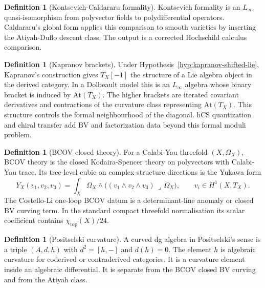 \documentclass[11pt]{amsart}
\theoremstyle{definition}
\newtheorem{definition}[theorem]{Definition}
\theoremstyle{remark}
\providecommand{\At}{\mathrm{At}}
\begin{document}
\begin{definition}[Kontsevich-Caldararu formality]
\label{def:kc-formality}
Kontsevich formality is an $L_\infty$ quasi-isomorphism from
polyvector fields to polydifferential operators. Caldararu's global
form applies this comparison to smooth varieties by inserting the
Atiyah-Duflo descent class. The output is a corrected Hochschild
calculus comparison.
\end{definition}

\begin{definition}[Kapranov brackets]
\label{def:kapranov-brackets}
Under Hypothesis~\ref{hyp:kapranov-shifted-lie}, Kapranov's
construction gives $T_X[-1]$ the structure of a Lie algebra object in
the derived category. In a Dolbeault model this is an $L_\infty$
algebra whose binary bracket is induced by $\At(T_X)$. The higher
brackets are iterated covariant derivatives and contractions of the
curvature class representing $\At(T_X)$. This structure controls the
formal neighbourhood of the diagonal. hCS quantization and chiral
transfer add BV and factorization data beyond this formal moduli
problem.
\end{definition}

\begin{definition}[BCOV closed theory]
\label{def:bcov-theory}
For a Calabi-Yau threefold $(X,\Omega_X)$, BCOV theory is the closed
Kodaira-Spencer theory on polyvectors with Calabi-Yau trace. Its
tree-level cubic on complex-structure directions is the Yukawa form
\[
  Y_X(v_1,v_2,v_3)
  =
  \int_X
  \Omega_X\wedge
  \bigl((v_1\wedge v_2\wedge v_3)\,\lrcorner\,\Omega_X\bigr),
  \qquad v_i\in H^1(X,T_X).
\]
The Costello-Li one-loop BCOV datum is a determinant-line anomaly or
closed BV curving term. In the standard compact threefold
normalisation its scalar coefficient contains $\chi_{\mathrm{top}}(X)/24$.
\end{definition}

\begin{definition}[Positselski curvature]
\label{def:positselski-curvature}
A curved dg algebra in Positselski's sense is a triple $(A,d,h)$ with
$d^2=[h,-]$ and $d(h)=0$. The element $h$ is algebraic curvature for
coderived or contraderived categories. It is a curvature element inside
an algebraic differential. It is separate from the BCOV closed BV
curving and from the Atiyah class.
\end{definition}
\end{document}
